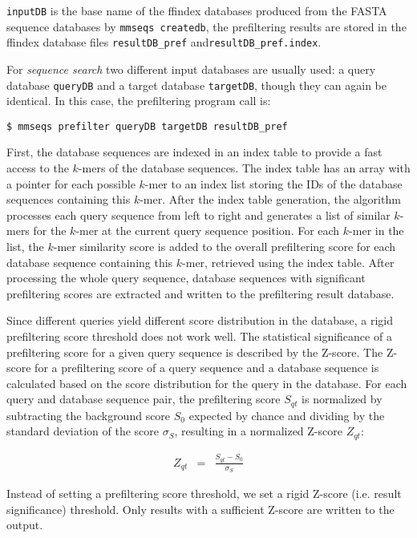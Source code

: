 \documentclass[11pt,a4paper]{scrreprt}
\begin{document}
\texttt{inputDB} is the base name of the ffindex databases produced from the FASTA sequence databases by \texttt{mmseqs createdb}, the prefiltering results are stored in the ffindex database files \texttt{resultDB\_pref} and\texttt{resultDB\_pref.index}.

For \emph{sequence search} two different input databases are usually used: a query database \texttt{queryDB} and a target database \texttt{targetDB}, though they can again be identical. In this case, the prefiltering program call is:

\begin{verbatim}
$ mmseqs prefilter queryDB targetDB resultDB_pref 
\end{verbatim}

First, the database sequences are indexed in an index table to provide a fast access to the $k$-mers of the database sequences. The index table has an array with a pointer for each possible $k$-mer to an index list storing the IDs of the database sequences containing this $k$-mer. After the index table generation, the algorithm processes each query sequence from left to right and generates a list of similar $k$-mers for the $k$-mer at the current query sequence position. For each $k$-mer in the list, the $k$-mer similarity score is added to the overall prefiltering score for each database sequence containing this $k$-mer, retrieved using the index table. After processing the whole query sequence, database sequences with significant prefiltering scores are extracted and written to the prefiltering result database. 

Since different queries yield different score distribution in the database, a rigid prefiltering score threshold does not work well. The statistical significance of a prefiltering score for a given query sequence is described by the Z-score. The Z-score for a prefiltering score of a query sequence and a database sequence is calculated based on the score distribution for the query in the database. For each query and database sequence pair, the prefiltering score $S_{qt}$ is normalized by subtracting the background score $S_{0}$ expected by chance and dividing by the standard deviation of the score $\sigma_{S}$, resulting in a normalized Z-score $Z_{qt}$:

\begin{eqnarray*}
Z_{qt} & = & \frac{S_{qt}-S_{0}}{\sigma_{S}}
\end{eqnarray*}

Instead of setting a prefiltering score threshold, we set a rigid Z-score (i.e. result significance) threshold. Only results with a sufficient Z-score are written to the output.
\end{document}
